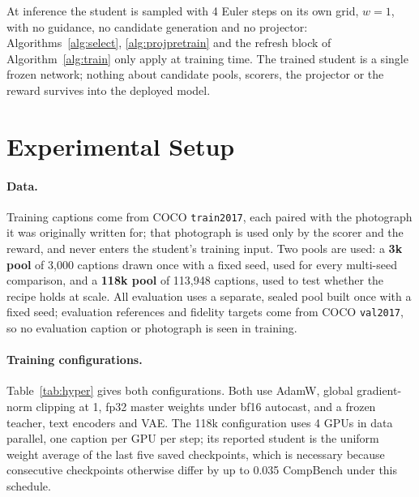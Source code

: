 \documentclass{article} %
\begin{document}
At inference the student is sampled with 4 Euler steps on its own grid, $w{=}1$, with no guidance,
no candidate generation and no projector: Algorithms~\ref{alg:select}, \ref{alg:projpretrain} and the
refresh block of Algorithm~\ref{alg:train} only apply at training time. The trained student is a
single frozen network; nothing about candidate pools, scorers, the projector or the reward survives
into the deployed model.

\section{Experimental Setup}
\label{sec:setup}

\paragraph{Data.} Training captions come from COCO \texttt{train2017}, each paired with the
photograph it was originally written for; that photograph is used only by the scorer and the
reward, and never enters the student's training input. Two pools are used: a \textbf{3k pool} of
3,000 captions drawn once with a fixed seed, used for every multi-seed comparison, and a
\textbf{118k pool} of 113,948 captions, used to test whether the recipe holds at scale. All
evaluation uses a separate, sealed pool built once with a fixed seed; evaluation references and
fidelity targets come from COCO \texttt{val2017}, so no evaluation caption or photograph is seen in
training.

\paragraph{Training configurations.} Table~\ref{tab:hyper} gives both configurations. Both use
AdamW, global gradient-norm clipping at 1, fp32 master weights under bf16 autocast, and a frozen
teacher, text encoders and VAE. The 118k configuration uses 4 GPUs in data parallel, one caption per
GPU per step; its reported student is the uniform weight average of the last five saved checkpoints,
which is necessary because consecutive checkpoints otherwise differ by up to 0.035 CompBench under
this schedule.
\end{document}
